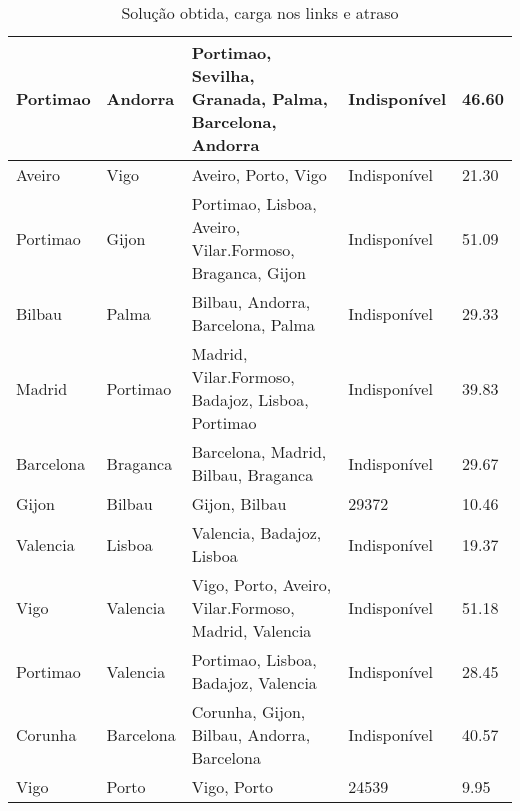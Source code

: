 \begin{table}[!htb]
{\begin{tabular}{|l|l|l|l|l|}
Portimao & Andorra & Portimao, Sevilha, Granada, Palma, Barcelona, Andorra & Indisponível & 46.60 \\ \hline
Aveiro & Vigo & Aveiro, Porto, Vigo & Indisponível & 21.30 \\ \hline
Portimao & Gijon & Portimao, Lisboa, Aveiro, Vilar.Formoso, Braganca, Gijon & Indisponível & 51.09 \\ \hline
Bilbau & Palma & Bilbau, Andorra, Barcelona, Palma & Indisponível & 29.33 \\ \hline
Madrid & Portimao & Madrid, Vilar.Formoso, Badajoz, Lisboa, Portimao & Indisponível & 39.83 \\ \hline
Barcelona & Braganca & Barcelona, Madrid, Bilbau, Braganca & Indisponível & 29.67 \\ \hline
Gijon & Bilbau & Gijon, Bilbau & 29372 & 10.46 \\ \hline
Valencia & Lisboa & Valencia, Badajoz, Lisboa & Indisponível & 19.37 \\ \hline
Vigo & Valencia & Vigo, Porto, Aveiro, Vilar.Formoso, Madrid, Valencia & Indisponível & 51.18 \\ \hline
Portimao & Valencia & Portimao, Lisboa, Badajoz, Valencia & Indisponível & 28.45 \\ \hline
Corunha & Barcelona & Corunha, Gijon, Bilbau, Andorra, Barcelona & Indisponível & 40.57 \\ \hline
Vigo & Porto & Vigo, Porto & 24539 & 9.95 \\ \hline
\end{tabular}}
\caption[]{Solução obtida, carga nos links e atraso}
\end{table}

